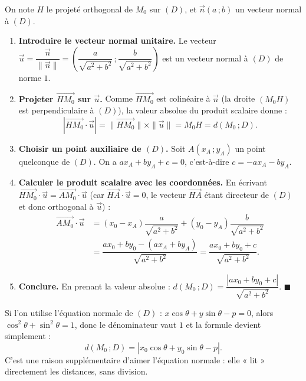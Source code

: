 \documentclass[11pt]{article}
\newcommand{\cle}[1]{{\popxbold\color{popdark}#1}}
\begin{document}
\begin{experience}
On note $H$ le projeté orthogonal de $M_0$ sur $(D)$, et $\vec{n}(a\,;b)$ un vecteur normal à $(D)$.
\begin{enumerate}
\item \textbf{Introduire le vecteur normal unitaire.} Le vecteur $\vec{u} = \dfrac{\vec{n}}{\|\vec{n}\|} = \left(\dfrac{a}{\sqrt{a^2+b^2}}\,;\dfrac{b}{\sqrt{a^2+b^2}}\right)$ est un vecteur normal à $(D)$ de norme $1$.
\item \textbf{Projeter $\overrightarrow{HM_0}$ sur $\vec{u}$.} Comme $\overrightarrow{HM_0}$ est colinéaire à $\vec{n}$ (la droite $(M_0H)$ est perpendiculaire à $(D)$), la valeur absolue du produit scalaire donne :
\[ \left|\overrightarrow{HM_0}\cdot\vec{u}\right| = \|\overrightarrow{HM_0}\|\times\|\vec{u}\| = M_0H = d(M_0\,;D). \]
\item \textbf{Choisir un point auxiliaire de $(D)$.} Soit $A(x_A\,;y_A)$ un point quelconque de $(D)$. On a $ax_A + by_A + c = 0$, c'est-à-dire $c = -ax_A - by_A$.
\item \textbf{Calculer le produit scalaire avec les coordonnées.} En écrivant $\overrightarrow{HM_0}\cdot\vec{u} = \overrightarrow{AM_0}\cdot\vec{u}$ (car $\overrightarrow{HA}\cdot\vec{u}=0$, le vecteur $\overrightarrow{HA}$ étant directeur de $(D)$ et donc orthogonal à $\vec{u}$) :
\begin{align*}
\overrightarrow{AM_0}\cdot\vec{u} &= (x_0 - x_A)\dfrac{a}{\sqrt{a^2+b^2}} + (y_0 - y_A)\dfrac{b}{\sqrt{a^2+b^2}}\\
&= \dfrac{ax_0 + by_0 - (ax_A + by_A)}{\sqrt{a^2+b^2}} = \dfrac{ax_0 + by_0 + c}{\sqrt{a^2+b^2}}.
\end{align*}
\item \textbf{Conclure.} En prenant la valeur absolue : $d(M_0\,;D) = \dfrac{|ax_0 + by_0 + c|}{\sqrt{a^2+b^2}}$. $\blacksquare$
\end{enumerate}
\end{experience}

\begin{aretenir}
Si l'on utilise l'\cle{équation normale} de $(D)$ : $x\cos\theta + y\sin\theta - p = 0$, alors $\cos^2\theta + \sin^2\theta = 1$, donc le dénominateur vaut $1$ et la formule devient simplement :
\[ d(M_0\,;D) = \left|x_0\cos\theta + y_0\sin\theta - p\right|. \]
C'est une raison supplémentaire d'aimer l'équation normale : elle « lit » directement les distances, sans division.
\end{aretenir}
\end{document}
